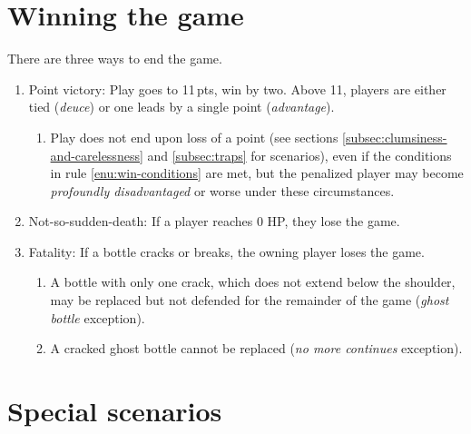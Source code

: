 \documentclass[11pt,letterpaper,twocolumn,english,DIV=calc]{scrartcl}
\begin{document}
\section{Winning the game}
There are three ways to end the game.
\begin{enumerate}
	\item \label{enu:win-conditions}Point victory: Play goes to 11\,pts, win by two.
		Above 11, players are either tied (\emph{deuce}) or one leads by a single point (\emph{advantage}).
		\begin{enumerate}
			\item Play does not end upon loss of a point (see sections \ref{subsec:clumsiness-and-carelessness} and \ref{subsec:traps} for scenarios), even if the conditions in rule \ref{enu:win-conditions} are met, but the penalized player may become \emph{profoundly disadvantaged} or worse under these circumstances.
		\end{enumerate}
	
	\item Not-so-sudden-death: If a player reaches 0 HP, they lose the game.

	\item Fatality: If a bottle cracks or breaks, the owning player loses the game.
	\begin{enumerate}
		\item A bottle with only one crack, which does not extend below the shoulder, may be replaced but not defended for the remainder of the game (\emph{ghost bottle} exception).
		\item A cracked ghost bottle cannot be replaced (\emph{no more continues} exception).
	\end{enumerate}
\end{enumerate}

\section{\label{sec:special-scenarios}Special scenarios}
\end{document}
